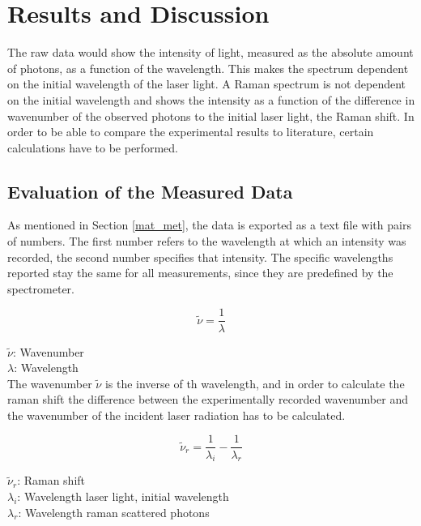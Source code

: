 \section{Results and Discussion}
The raw data would show the intensity of light, measured as the absolute amount of photons, as a function of the wavelength. This makes the spectrum dependent on the initial wavelength of the laser light. A Raman spectrum is not dependent on the initial wavelength and shows the intensity as a function of the difference in wavenumber of the observed photons to the initial laser light, the Raman shift. In order to be able to compare the experimental results to literature, certain calculations have to be performed.

\subsection{Evaluation of the Measured Data}

    As mentioned in Section \ref{mat_met}, the data is exported as a text file with pairs of numbers. The first number refers to the wavelength at which an intensity was recorded, the second number specifies that intensity. The specific wavelengths reported stay the same for all measurements, since they are predefined by the spectrometer.


    \begin{equation}
        \widetilde{\nu} = \frac{1}{\lambda}
    \end{equation}

    \(\widetilde{\nu}\): Wavenumber\\
    \(\lambda\): Wavelength\\

  The wavenumber \(\widetilde{\nu}\) is the inverse of th wavelength, and in order to calculate the raman shift the difference between the experimentally recorded wavenumber and the wavenumber of the incident laser radiation has to be calculated.

    \begin{equation} \label{eq:1}
        \widetilde{\nu}_r = \frac{1}{\lambda_i} - \frac{1}{\lambda_r}
    \end{equation}

    \(\widetilde{\nu}_r\): Raman shift\\
    \(\lambda_i\): Wavelength laser light, initial wavelength\\
    \(\lambda_r\): Wavelength raman scattered photons

    \bigskip

